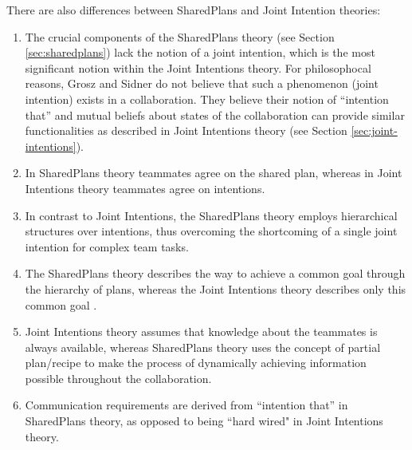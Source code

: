 \documentclass[12pt]{report}
\begin{document}
There are also differences between SharedPlans and Joint Intention theories:

\begin{enumerate}
  \item The crucial components of the SharedPlans theory (see Section  
  \ref{sec:sharedplans}) lack the notion of a joint intention, which is the most
  significant notion within the Joint Intentions theory. For philosophocal
  reasons, Grosz and Sidner do not believe that such a phenomenon (joint
  intention) exists in a collaboration. They believe their notion of ``intention
  that'' and mutual beliefs about states of the collaboration can provide
  similar functionalities as described in Joint Intentions theory (see Section
  \ref{sec:joint-intentions}).
  
  \item In SharedPlans theory teammates agree on the shared plan, whereas in
  Joint Intentions theory teammates agree on intentions.
  
  \item In contrast to Joint Intentions, the SharedPlans theory employs
  hierarchical structures over intentions, thus overcoming the shortcoming of
  a single joint intention for complex team tasks.
  
  \item The SharedPlans theory describes the way to achieve a common goal
  through the hierarchy of plans, whereas the Joint Intentions theory describes
  only this common goal \cite{skubch:modelling-behavior-robots}.
  
  \item Joint Intentions theory assumes that knowledge about the teammates is
  always available, whereas SharedPlans theory uses the concept of partial
  plan/recipe to make the process of dynamically achieving information possible
  throughout the collaboration.
  
  \item Communication requirements are derived from ``intention that'' in
  SharedPlans theory, as opposed to being ``hard wired" in Joint Intentions
  theory.
\end{enumerate}
\end{document}
